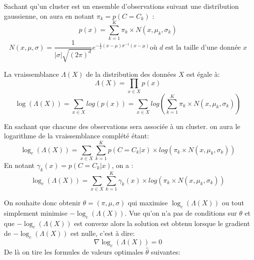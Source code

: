 \documentclass[12pt, french, latin.medieval, a4paper]{report}
\begin{document}
            Sachant qu'un cluster est un ensemble d'observations suivant une distribution gaussienne, on aura en notant $\pi_k = p(C=C_k)$ :
            \begin{equation}
                p(x) = \sum_{k=1}^{K} \pi_k \times N(x, \mu_{k}, \sigma_{k})
            \end{equation}
            \begin{equation}
                N(x, \mu, \sigma) = \frac{1}{|\sigma| \sqrt{(2\pi)^d}} e^{-\frac{1}{2}(x-\mu){\sigma}^{-1}(x-\mu)} \text{où $d$ est la taille d'une donnée $x$}
            \end{equation}
        
            La vraissemblance $\Lambda(X)$ de la distribution des données $X$ est égale à:
            \begin{equation}
            \Lambda(X) = \prod_{x \in X} p(x)
            \end{equation}
            \begin{equation}
                \log(\Lambda(X)) = \sum_{x \in X} log(p(x)) =  \sum_{x \in X} log(\sum_{k=1}^{K} \pi_k \times N(x, \mu_{k}, \sigma_{k}))
            \end{equation}
            
            En sachant que chacune des observations sera associée à un cluster. on aura le logarithme de la vraissemblance complété étant:
            \begin{equation}
                \log_c(\Lambda(X)) = \sum_{x \in X}\sum_{k=1}^{K} p(C=C_{k}|x) \times log(\pi_k \times N(x, \mu_{k}, \sigma_{k}))
            \end{equation}
            En notant $\gamma_{k}(x) = p(C=C_{k}|x)$, on a :
            \begin{equation}
                \log_c(\Lambda(X)) = \sum_{x \in X}\sum_{k=1}^{K} \gamma_{k}(x) \times log(\pi_k \times N(x, \mu_{k}, \sigma_{k}))
            \end{equation}

            On souhaite donc obtenir $\theta = (\pi, \mu, \sigma)$ qui maximise $\log_c(\Lambda(X))$ ou tout simplement minimise $-\log_c(\Lambda(X))$. Vue qu'on n'a pas de conditions sur $\theta$ et que $-\log_c(\Lambda(X))$ est convexe alors la solution est obtenu lorsque le gradient de $-\log_c(\Lambda(X))$ est nulle, c'est à dire:
            \begin{equation}
                \nabla\log_c(\Lambda(X)) = 0
            \end{equation}
            De là on tire les formules de valeurs optimales $\hat{\theta}$ suivantes:
\end{document}
